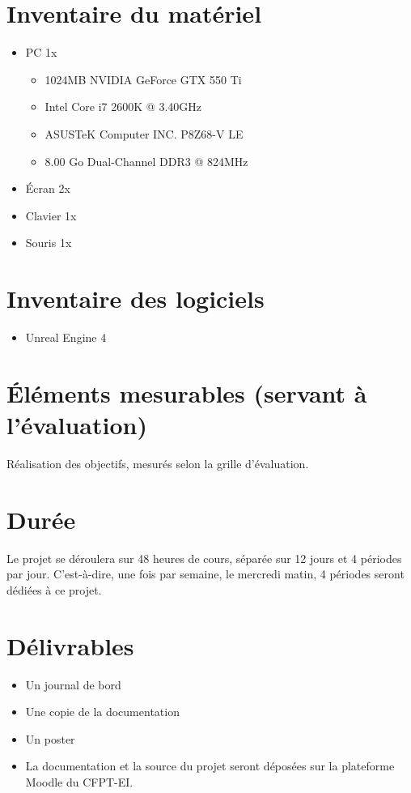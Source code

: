 \documentclass[11pt, a4paper]{article}
\begin{document}
\section{Inventaire du matériel}
\begin{itemize}
\item PC 1x
	\begin{itemize}
	\item 1024MB NVIDIA GeForce GTX 550 Ti
	\item Intel Core i7 2600K @ 3.40GHz
	\item ASUSTeK Computer INC. P8Z68-V LE
	\item 8.00 Go Dual-Channel DDR3 @ 824MHz
	\end{itemize}
\item Écran 2x
\item Clavier 1x
\item Souris 1x
\end{itemize}
\section{Inventaire des logiciels}
\begin{itemize}
\item Unreal Engine 4
\end{itemize}
\section{Éléments mesurables (servant à l'évaluation)}
Réalisation des objectifs, mesurés selon la grille d'évaluation.
\section{Durée}
Le projet se déroulera sur 48 heures de cours, séparée sur 12 jours et 4 périodes par jour. C'est-à-dire, une fois par semaine, le mercredi matin, 4 périodes seront dédiées à ce projet.
\section{Délivrables}
\begin{itemize}
\item Un journal de bord
\item Une copie de la documentation
\item Un poster
\item La documentation et la source du projet seront déposées sur la plateforme Moodle du CFPT-EI.
\end{itemize}
\end{document}
